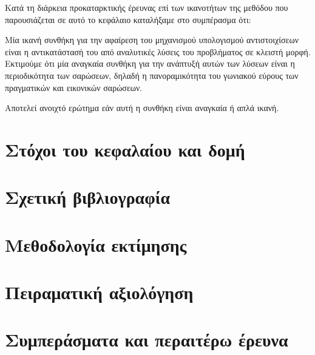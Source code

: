 Κατά τη διάρκεια προκαταρκτικής έρευνας επί των ικανοτήτων της μεθόδου που
παρουσιάζεται σε αυτό το κεφάλαιο καταλήξαμε στο συμπέρασμα ότι:

\begin{claim}
\label{claim:02_03:01}
  Μία ικανή συνθήκη για την αφαίρεση του μηχανισμού υπολογισμού αντιστοιχίσεων
  είναι η αντικατάστασή του από αναλυτικές λύσεις του προβλήματος σε κλειστή
  μορφή.  Εκτιμούμε ότι μία αναγκαία συνθήκη για την ανάπτυξή αυτών των λύσεων
  είναι η περιοδικότητα των σαρώσεων, δηλαδή η πανοραμικότητα του γωνιακού
  εύρους των πραγματικών και εικονικών σαρώσεων.
\end{claim}

Αποτελεί ανοιχτό ερώτημα εάν αυτή η συνθήκη είναι αναγκαία ή απλά ικανή.

\section{Στόχοι του κεφαλαίου και δομή}
  \label{section:02_03_01}
  

\section{Σχετική βιβλιογραφία}
  \label{section:02_03_02}
  

\section{Μεθοδολογία εκτίμησης}
  \label{section:02_03_03}
  

\section{Πειραματική αξιολόγηση}
  \label{section:02_03_04}
  

\section{Συμπεράσματα και περαιτέρω έρευνα}
  \label{section:02_03_05}
  
